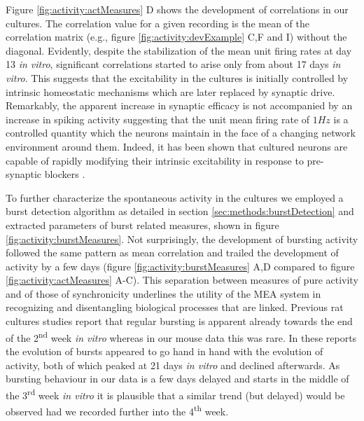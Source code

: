         Figure \ref{fig:activity:actMeasures} D shows the development of correlations in our cultures. The correlation value for a given recording is the mean of the correlation matrix (e.g., figure \ref{fig:activity:devExample} C,F and I) without the diagonal. Evidently, despite the stabilization of the mean unit firing rates at day 13 \textit{in vitro}, significant correlations started to arise only from about 17 days \textit{in vitro}. This suggests that the excitability in the cultures is initially controlled by intrinsic homeostatic mechanisms which are later replaced by synaptic drive. Remarkably, the apparent increase in synaptic efficacy is not accompanied by an increase in spiking activity suggesting that the unit mean firing rate of \(1 Hz\) is a controlled quantity which the neurons maintain in the face of a changing network environment around them. Indeed, it has been shown that cultured neurons are capable of rapidly modifying their intrinsic excitability in response to pre-synaptic blockers \cite{penn2016network}.


        To further characterize the spontaneous activity in the cultures we employed a burst detection algorithm as detailed in section \ref{sec:methods:burstDetection} and extracted parameters of burst related measures, shown in figure \ref{fig:activity:burstMeasures}. Not surprisingly, the development of bursting activity followed the same pattern as mean correlation and trailed the development of activity by a few days (figure \ref{fig:activity:burstMeasures} A,D compared to figure \ref{fig:activity:actMeasures} A-C). This separation between measures of pure activity and of those of synchronicity underlines the utility of the MEA system in recognizing and disentangling biological processes that are linked. Previous rat cultures studies report that regular bursting is apparent already towards the end of the 2\textsuperscript{nd} week \textit{in vitro} \cite{van2004long,wagenaar2006extremely,chiappalone2006dissociated,bikbaev2015brain} whereas in our mouse data this was rare. In these reports the evolution of bursts appeared to go hand in hand with the evolution of activity, both of which peaked at 21 days \textit{in vitro} and declined afterwards. As bursting behaviour in our data is a few days delayed and starts in the middle of the 3\textsuperscript{rd} week \textit{in vitro} it is plausible that a similar trend (but delayed) would be observed had we recorded further into the 4\textsuperscript{th} week.

